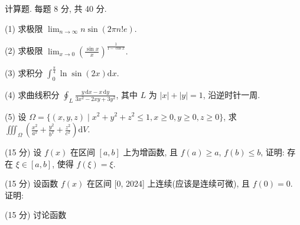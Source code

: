 \par{}
计算题. 每题 8 分, 共 40 分.\par
(1) 求极限 $\lim_{n\to \infty}n\sin (2\pi n!e)$.\par
(2) 求极限 $\lim_{x\to 0}\left(\frac{\sin x}{x}\right)^{\frac{1}{1 - \cos x}}.$\par
(3) 求积分  $\int_{0}^{\frac{\pi}{4}}\ln\sin(2x)\mathrm{d}x.$\par
(4) 求曲线积分 $\oint_{L} \frac{y \, \mathrm{d}x - x \, \mathrm{d}y}{3x^{2} - 2xy + 3y^{2}}$, 其中 $L$ 为 $|x| + |y| = 1$, 沿逆时针一周.\par
(5) 设 $\Omega = \{(x, y, z) \mid x^2 + y^2 + z^2 \leq 1, x \geq 0, y \geq 0, z \geq 0\}$, 求 $\iiint_{\Omega} \left( \frac{x^2}{a^2} + \frac{y^2}{b^2} + \frac{z^2}{c^2} \right) \mathrm{d}V$.\par
\par{}
(15 分) 设 $f(x)$ 在区间 $[a, b]$ 上为增函数, 且 $f(a) \geq a$, $f(b) \leq b$, 证明: 存在 $\xi \in [a, b]$, 使得 $f(\xi) = \xi$.\par
\par{}
\par{}
(15 分) 设函数 $f(x)$ 在区间 [0, 2024] 上连续(应该是连续可微), 且 $f(0) = 0$. 证明:\par
\nopagebreak[4]
\par{}
\par{}
(15 分) 讨论函数\par
\nopagebreak[4]
